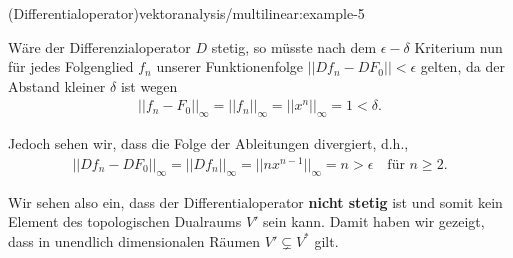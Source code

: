 \documentclass[letterpaper,10pt,english]{jupyterBook}
\begin{document}
\begin{example}{(Differentialoperator)}{vektoranalysis/multilinear:example-5}
\par
Wäre der Differenzialoperator \(D\) stetig, so müsste nach dem \(\epsilon-\delta\) Kriterium nun für jedes Folgenglied \(f_n\) unserer Funktionenfolge \(||Df_n - DF_0|| < \epsilon\) gelten, da der Abstand kleiner \(\delta\) ist wegen
\begin{align*}
||f_n - F_0||_\infty = ||f_n||_\infty = ||x^n||_\infty = 1 < \delta.
\end{align*}
\par
Jedoch sehen wir, dass die Folge der Ableitungen divergiert, d.h.,
\begin{align*}
||Df_n - DF_0||_\infty = ||Df_n||_\infty = ||nx^{n-1}||_\infty = n > \epsilon \quad \text{für } n\geq 2.
\end{align*}
\par
Wir sehen also ein, dass der Differentialoperator \textbf{nicht stetig} ist und somit kein Element des topologischen Dualraums \(V'\) sein kann.
Damit haben wir gezeigt, dass in unendlich dimensionalen Räumen \(V' \subsetneq V^\ast\) gilt.
\end{example}
\end{document}
